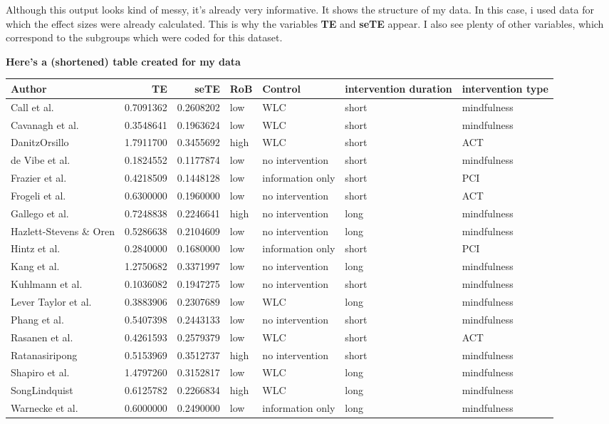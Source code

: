 \documentclass[]{book}
\theoremstyle{definition}
\theoremstyle{definition}
\theoremstyle{definition}
\theoremstyle{remark}
\begin{document}
Although this output looks kind of messy, it's already very informative.
It shows the structure of my data. In this case, i used data for which
the effect sizes were already calculated. This is why the variables
\textbf{TE} and \textbf{seTE} appear. I also see plenty of other
variables, which correspond to the subgroups which were coded for this
dataset.

\textbf{Here's a (shortened) table created for my data}

\begin{tabular}{l|r|r|l|l|l|l}
\hline
Author & TE & seTE & RoB & Control & intervention duration & intervention type\\
\hline
Call et al. & 0.7091362 & 0.2608202 & low & WLC & short & mindfulness\\
\hline
Cavanagh et al. & 0.3548641 & 0.1963624 & low & WLC & short & mindfulness\\
\hline
DanitzOrsillo & 1.7911700 & 0.3455692 & high & WLC & short & ACT\\
\hline
de Vibe et al. & 0.1824552 & 0.1177874 & low & no intervention & short & mindfulness\\
\hline
Frazier et al. & 0.4218509 & 0.1448128 & low & information only & short & PCI\\
\hline
Frogeli et al. & 0.6300000 & 0.1960000 & low & no intervention & short & ACT\\
\hline
Gallego et al. & 0.7248838 & 0.2246641 & high & no intervention & long & mindfulness\\
\hline
Hazlett-Stevens \& Oren & 0.5286638 & 0.2104609 & low & no intervention & long & mindfulness\\
\hline
Hintz et al. & 0.2840000 & 0.1680000 & low & information only & short & PCI\\
\hline
Kang et al. & 1.2750682 & 0.3371997 & low & no intervention & long & mindfulness\\
\hline
Kuhlmann et al. & 0.1036082 & 0.1947275 & low & no intervention & short & mindfulness\\
\hline
Lever Taylor et al. & 0.3883906 & 0.2307689 & low & WLC & long & mindfulness\\
\hline
Phang et al. & 0.5407398 & 0.2443133 & low & no intervention & short & mindfulness\\
\hline
Rasanen et al. & 0.4261593 & 0.2579379 & low & WLC & short & ACT\\
\hline
Ratanasiripong & 0.5153969 & 0.3512737 & high & no intervention & short & mindfulness\\
\hline
Shapiro et al. & 1.4797260 & 0.3152817 & low & WLC & long & mindfulness\\
\hline
SongLindquist & 0.6125782 & 0.2266834 & high & WLC & long & mindfulness\\
\hline
Warnecke et al. & 0.6000000 & 0.2490000 & low & information only & long & mindfulness\\
\hline
\end{tabular}
\end{document}
